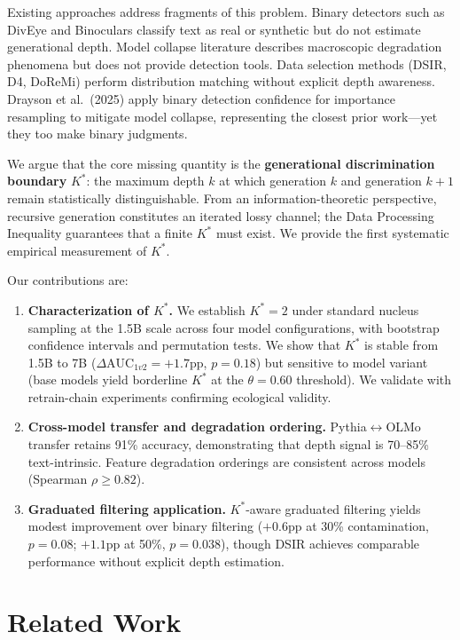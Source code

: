 \documentclass[11pt,a4paper]{article}
\newcommand{\Kstar}{K^{*}}
\begin{document}
Existing approaches address fragments of this problem.
Binary detectors such as DivEye and Binoculars classify text as real or synthetic but do not estimate generational depth.
Model collapse literature describes macroscopic degradation phenomena but does not provide detection tools.
Data selection methods (DSIR, D4, DoReMi) perform distribution matching without explicit depth awareness.
Drayson et al.\ (2025) apply binary detection confidence for importance resampling to mitigate model collapse, representing the closest prior work---yet they too make binary judgments.

We argue that the core missing quantity is the \textbf{generational discrimination boundary} $\Kstar$: the maximum depth $k$ at which generation $k$ and generation $k+1$ remain statistically distinguishable.
From an information-theoretic perspective, recursive generation constitutes an iterated lossy channel; the Data Processing Inequality guarantees that a finite $\Kstar$ must exist.
We provide the first systematic empirical measurement of $\Kstar$.

Our contributions are:
\begin{enumerate}[nosep,leftmargin=1.5em]
    \item \textbf{Characterization of $\Kstar$.} We establish $\Kstar=2$ under standard nucleus sampling at the 1.5B scale across four model configurations, with bootstrap confidence intervals and permutation tests. We show that $\Kstar$ is stable from 1.5B to 7B ($\Delta\mathrm{AUC}_{1v2}=+1.7$pp, $p=0.18$) but sensitive to model variant (base models yield borderline $\Kstar$ at the $\theta=0.60$ threshold). We validate with retrain-chain experiments confirming ecological validity.
    \item \textbf{Cross-model transfer and degradation ordering.} Pythia$\leftrightarrow$OLMo transfer retains 91\% accuracy, demonstrating that depth signal is 70--85\% text-intrinsic. Feature degradation orderings are consistent across models (Spearman $\rho \geq 0.82$).
    \item \textbf{Graduated filtering application.} $\Kstar$-aware graduated filtering yields modest improvement over binary filtering ($+0.6$pp at 30\% contamination, $p=0.08$; $+1.1$pp at 50\%, $p=0.038$), though DSIR achieves comparable performance without explicit depth estimation.
\end{enumerate}

\section{Related Work}
\label{sec:related}
\end{document}
